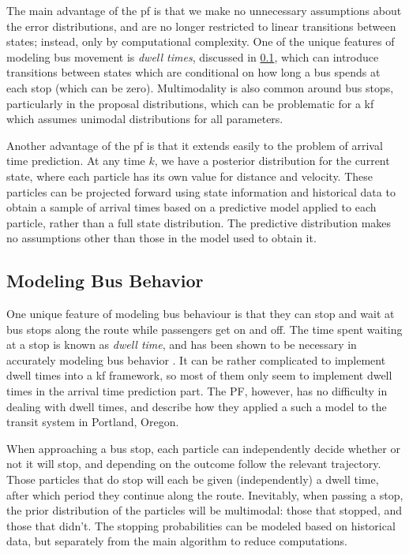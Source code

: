 \documentclass[12pt,a4paper]{article}
\begin{document}
The main advantage of the \gls{pf} is that we make no unnecessary 
assumptions about the error distributions, 
and are no longer restricted to linear transitions between states;
instead, only by computational complexity.
One of the unique features of modeling bus movement
is \emph{dwell times},  discussed in \cref{sec:busbehavior},
which can introduce transitions between states which are conditional on
how long a bus spends at each stop (which can be zero).
Multimodality is also common around bus stops, particularly in the proposal distributions, 
which can be problematic for a \gls{kf} 
which assumes unimodal distributions for all parameters.


Another advantage of the \gls{pf} is that it extends easily to the problem of arrival time prediction.
At any time $k$, we have a posterior distribution for the current state,
where each particle has its own value for distance and velocity. 
These particles can be projected forward using state information and historical data
to obtain a sample of arrival times
based on a predictive model applied to each particle,
rather than a full state distribution.
The predictive distribution makes no assumptions other than those in the model
used to obtain it.









\subsection{Modeling Bus Behavior}
\label{sec:busbehavior}


One unique feature of modeling bus behaviour is that 
they can stop and wait at bus stops along the route
while passengers get on and off.
The time spent waiting at a stop is known as \emph{dwell time},
and has been shown to be necessary in accurately modeling bus behavior \citep{cn}.
It can be rather complicated to implement dwell times into a \gls{kf} framework,
so most of them only seem to implement dwell times in the arrival time prediction part.
The PF, however, has no difficulty in dealing with dwell times,
and \cite{hans-etal:2015} describe how they applied a such a model
to the transit system in Portland, Oregon.


When approaching a bus stop,
each particle can independently decide whether or not it will stop,
and depending on the outcome follow the relevant trajectory.
Those particles that do stop will each be given (independently)
a dwell time, after which period they continue along the route.
Inevitably, when passing a stop, the prior distribution of the particles will be multimodal:
those that stopped, and those that didn't.
The stopping probabilities can be modeled based on historical data,
but separately from the main algorithm to reduce computations.
\end{document}
